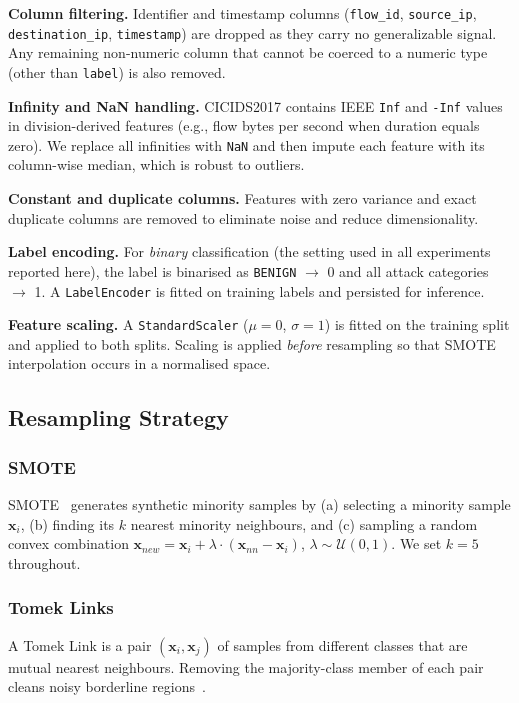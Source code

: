 \documentclass[conference]{IEEEtran}
\begin{document}
\textbf{Column filtering.}  Identifier and timestamp columns
(\texttt{flow\_id}, \texttt{source\_ip}, \texttt{destination\_ip},
\texttt{timestamp}) are dropped as they carry no generalizable signal.
Any remaining non-numeric column that cannot be coerced to a numeric
type (other than \texttt{label}) is also removed.

\textbf{Infinity and NaN handling.}  CICIDS2017 contains IEEE
\texttt{Inf} and \texttt{-Inf} values in division-derived features
(e.g., flow bytes per second when duration equals zero).  We replace
all infinities with \texttt{NaN} and then impute each feature with
its column-wise median, which is robust to outliers.

\textbf{Constant and duplicate columns.}  Features with zero variance
and exact duplicate columns are removed to eliminate noise and reduce
dimensionality.

\textbf{Label encoding.}  For \textit{binary} classification (the
setting used in all experiments reported here), the label is binarised
as \texttt{BENIGN} $\to$ 0 and all attack categories $\to$ 1.
A \texttt{LabelEncoder} is fitted on training labels and persisted for
inference.

\textbf{Feature scaling.}  A \texttt{StandardScaler} ($\mu = 0$,
$\sigma = 1$) is fitted on the training split and applied to both
splits.  Scaling is applied \textit{before} resampling so that SMOTE
interpolation occurs in a normalised space.

\subsection{Resampling Strategy}
\label{subsec:resample}

\subsubsection{SMOTE}
SMOTE~\cite{chawla2002smote} generates synthetic minority samples by
(a) selecting a minority sample $\mathbf{x}_i$,
(b) finding its $k$ nearest minority neighbours, and
(c) sampling a random convex combination
$\mathbf{x}_{new} = \mathbf{x}_i + \lambda \cdot (\mathbf{x}_{nn} - \mathbf{x}_i)$,
$\lambda \sim \mathcal{U}(0,1)$.
We set $k = 5$ throughout.

\subsubsection{Tomek Links}
A Tomek Link is a pair $(\mathbf{x}_i, \mathbf{x}_j)$ of samples from
different classes that are mutual nearest neighbours.  Removing the
majority-class member of each pair cleans noisy borderline
regions~\cite{batista2004}.
\end{document}

